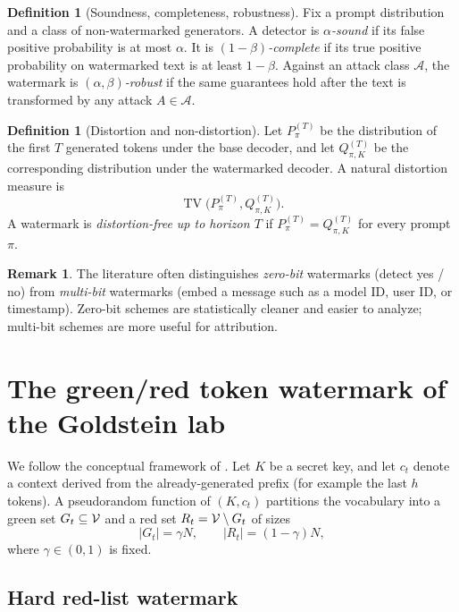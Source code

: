 \documentclass[11pt]{article}
\theoremstyle{definition}
\newtheorem{definition}[theorem]{Definition}
\newtheorem{remark}[theorem]{Remark}
\DeclareMathOperator{\TV}{TV}
\newcommand{\1}{\mathbf{1}}
\begin{document}
\begin{definition}[Soundness, completeness, robustness]
Fix a prompt distribution and a class of non-watermarked generators. A detector is \emph{$\alpha$-sound} if its false positive probability is at most $\alpha$. It is \emph{$(1-\beta)$-complete} if its true positive probability on watermarked text is at least $1-\beta$. Against an attack class $\mathcal{A}$, the watermark is \emph{$(\alpha,\beta)$-robust} if the same guarantees hold after the text is transformed by any attack $A \in \mathcal{A}$.
\end{definition}

\begin{definition}[Distortion and non-distortion]
Let $P_{\pi}^{(T)}$ be the distribution of the first $T$ generated tokens under the base decoder, and let $Q_{\pi,K}^{(T)}$ be the corresponding distribution under the watermarked decoder. A natural distortion measure is
\[
\TV\bigl(P_{\pi}^{(T)}, Q_{\pi,K}^{(T)}\bigr).
\]
A watermark is \emph{distortion-free up to horizon $T$} if $P_{\pi}^{(T)} = Q_{\pi,K}^{(T)}$ for every prompt $\pi$.
\end{definition}

\begin{remark}
The literature often distinguishes \emph{zero-bit} watermarks (detect yes / no) from \emph{multi-bit} watermarks (embed a message such as a model ID, user ID, or timestamp). Zero-bit schemes are statistically cleaner and easier to analyze; multi-bit schemes are more useful for attribution.
\end{remark}

\section{The green/red token watermark of the Goldstein lab}

We follow the conceptual framework of \cite{kirchenbauer2023watermark}. Let $K$ be a secret key, and let $c_t$ denote a context derived from the already-generated prefix (for example the last $h$ tokens). A pseudorandom function of $(K,c_t)$ partitions the vocabulary into a green set $G_t \subseteq {\cal V}$ and a red set $R_t = {\cal V} \setminus G_t$ of sizes
\[
|G_t| = \gamma N, \qquad |R_t| = (1-\gamma)N,
\]
where $\gamma \in (0,1)$ is fixed.

\subsection{Hard red-list watermark}
\end{document}
